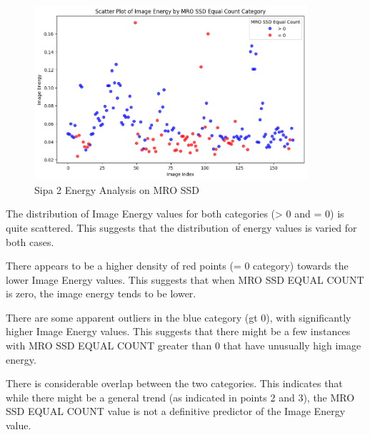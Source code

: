 \begin{figure}[ht]
    \centering
    \includegraphics[width=0.9\textwidth]{Figures/Results/sipa_02/energy.png}
    \caption[Sipa 2 Energy Analysis on MRO SSD]{Sipa 2 Energy Analysis on MRO SSD}
    \label{fig:Sipa 2 Energy Analysis on MRO SSD}
\end{figure}




The distribution of Image Energy values for both categories (> 0 and = 0) is quite scattered. This suggests that the distribution of energy values is varied for both cases.

There appears to be a higher density of red points (= 0 category) towards the lower Image Energy values. This suggests that when MRO SSD EQUAL COUNT is zero, the image energy tends to be lower.

There are some apparent outliers in the blue category (gt 0), with significantly higher Image Energy values. This suggests that there might be a few instances with MRO SSD EQUAL COUNT greater than 0 that have unusually high image energy.

There is considerable overlap between the two categories. This indicates that while there might be a general trend (as indicated in points 2 and 3), the MRO SSD EQUAL COUNT value is not a definitive predictor of the Image Energy value.

